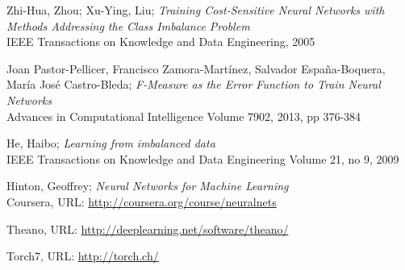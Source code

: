 \documentclass[a4paper,11pt]{article}
\begin{document}
\begin{thebibliography}{1}
 Zhi-Hua, Zhou; Xu-Ying, Liu;
 \emph{Training Cost-Sensitive Neural Networks with Methods Addressing the Class Imbalance Problem}\\
 IEEE Transactions on Knowledge and Data Engineering,
 2005 
 
 Joan Pastor-Pellicer, Francisco Zamora-Martínez, Salvador España-Boquera, María José Castro-Bleda;
 \emph{F-Measure as the Error Function to Train Neural Networks}\\
 Advances in Computational Intelligence
 Volume 7902, 2013, pp 376-384
 
 He, Haibo;
 \emph{Learning from imbalanced data}\\
 IEEE Transactions on Knowledge and Data Engineering
 Volume 21, no 9, 2009
 
 Hinton, Geoffrey;
 \emph{Neural Networks for Machine Learning}\\
 Coursera,
 URL: \url{http://coursera.org/course/neuralnets}
 
 Theano,
 URL: \url{http://deeplearning.net/software/theano/}
 
 Torch7,
 URL: \url{http://torch.ch/} 

\end{thebibliography}
\end{document}
